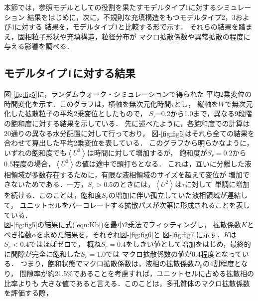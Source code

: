 ﻿本節では，参照モデルとしての役割を果たすモデルタイプ1に対するシミュレーション
結果をはじめに，次に，不規則な充填構造をもつモデルタイプ2，3および4に対する
結果を，モデルタイプ1と比較する形で示す．
それらの結果を踏まえ，固相粒子形状や充填構造，粒径分布が
マクロ拡散係数や異常拡散の程度に与える影響を調べる．
%
\subsection{モデルタイプ1に対する結果}
図-\ref{fig:fig5}に，ランダムウォーク・シミュレーションで得られた
平均2乗変位の時間変化を示す．このグラフは，横軸を無次元化時間$\tau$とし，
縦軸を$W$で無次元化した拡散粒子の平均2乗変位としたもので，
$S_r$=0.2から1.0まで，異なる9段階の飽和度に対する結果を示している．
先に述べたように，各飽和度での計算は20通りの異なる水分配置に対して行っており，
図-\ref{fig:fig5}はそれら全ての結果を合わせて算出した平均2乗変位を表している．
%
このグラフから明らかなように，いずれの飽和度でも$\left<U^2\right>$は時間に対して増加するが，
飽和度が$S_r=0.2$から0.5程度の場合，$\left<U^2\right>$の値は途中で頭打ちとなる．
これは，互いに分離した液相領域が多数存在するために，有限な液相領域のサイズを超えて変位が
増加できないためである．一方，$S_r>0.5$のときには，$\left<U^2\right>$は$\tau$に対して
単調に増加を続ける．このことは，飽和度$S_r$の増加に伴い孤立していた液相領域が連結して，
ユニットセルをパーコレートする拡散パスが次第に形成されることを表している．\\
\hspace{\parindent}
図-\ref{fig:fig5}の結果に式(\ref{eqn:Kb})を最小2乗法でフィッティングし，
拡散係数$\bar{K}$とべき指数$\alpha$を求めた結果を，それぞれ図-\ref{fig:fig6}と
図-\ref{fig:fig7}に示す．$\bar{K}$は$S_r<0.4$ではほぼゼロで，
概ね$S_r=0.4$をしきい値として増加をはじめ，最終的に間隙が完全に飽和した$S_r=1.0$では
マクロ拡散係数の値が0.4程度となっている．
つまり，飽和状態でマクロ拡散係数は，液相の拡散係数$D_0$の4割程度となり，
間隙率が約21.5\%であることを考慮すれば，ユニットセルに占める拡散相の比率よりも
大きな値であると言える．このことは，多孔質体のマクロ拡散係数を評価する際，
